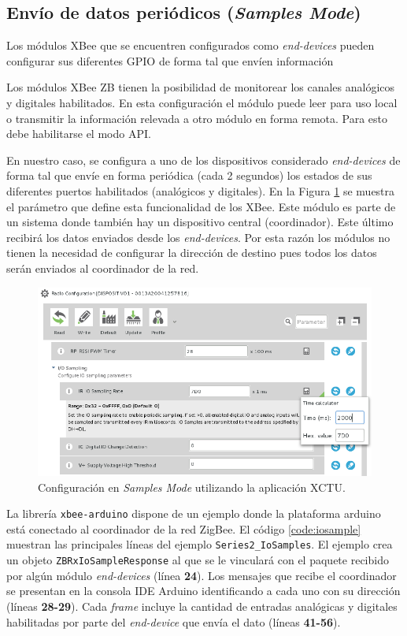 \documentclass[11pt,oneside,spanish,a4paper]{article}
\begin{document}
\subsection{Envío de datos periódicos (\emph{Samples Mode})}

Los módulos XBee que se encuentren configurados como
\textsl{end-devices} pueden configurar sus diferentes GPIO de forma
tal que envíen información 

Los módulos XBee ZB tienen la posibilidad de monitorear los canales
analógicos y digitales habilitados. En esta configuración el módulo
puede leer para uso local o transmitir la información relevada a otro
módulo en forma remota. Para esto debe habilitarse el modo
API\cite{s2c-ds}.

En nuestro caso, se configura a uno de los dispositivos considerado
\textsl{end-devices} de forma tal que envíe en forma periódica (cada 2
segundos) los estados de sus diferentes puertos habilitados
(analógicos y digitales). En la Figura \ref{fig:iosample-config} se
muestra el parámetro que define esta funcionalidad de los XBee. Este
módulo es parte de un sistema donde también hay un dispositivo central
(coordinador). Este último recibirá los datos enviados desde los
\textsl{end-devices}. Por esta razón los módulos no tienen la
necesidad de configurar la dirección de destino pues todos los datos
serán enviados al coordinador de la red.

\begin{figure}[h]
  \centering
  \includegraphics[width=.8\textwidth]{img/ioSampleConfig}
  \caption{Configuración en \textsl{Samples Mode} utilizando la
    aplicación XCTU.}
  \label{fig:iosample-config}
\end{figure}

La librería \texttt{xbee-arduino} dispone de un ejemplo donde la
plataforma arduino está conectado al coordinador de la red ZigBee. El
código \ref{code:iosample} muestran las principales líneas del ejemplo
\texttt{Series2\_IoSamples}. El ejemplo crea un objeto
\texttt{ZBRxIoSampleResponse} al que se le vinculará  con el paquete
recibido por algún módulo \textsl{end-devices} (línea
\textbf{24}). Los mensajes que recibe el coordinador se presentan en
la consola IDE Arduino identificando a cada uno con su dirección
(líneas \textbf{28-29}). Cada \textsl{frame} incluye la cantidad de
entradas analógicas y digitales habilitadas por parte del
\textsl{end-device} que envía el dato (líneas \textbf{41-56}).
\end{document}
